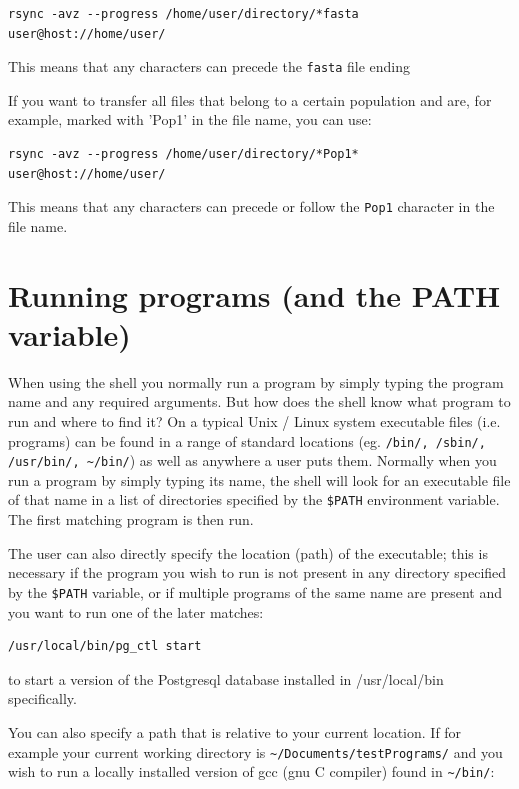 \documentclass[11pt]{article}
\begin{document}
\begin{verbatim}
rsync -avz --progress /home/user/directory/*fasta user@host://home/user/
\end{verbatim}
This means that any characters can precede the \texttt{fasta} file ending



If you want to transfer all files that belong to a certain population
and are, for example, marked with 'Pop1' in the file name, you can use:

\begin{verbatim}
rsync -avz --progress /home/user/directory/*Pop1* user@host://home/user/
\end{verbatim}
This means that any characters can precede or follow the \texttt{Pop1}
character in the file name.

\section{Running programs (and the PATH variable)}
\label{sec-3}

When using the shell you normally run a program by simply typing the
program name and any required arguments. But how does the shell know
what program to run and where to find it? On a typical Unix / Linux
system executable files (i.e. programs) can be found in a range of
standard locations (eg. \texttt{/bin/, /sbin/, /usr/bin/, \textasciitilde{}/bin/}) as well as
anywhere a user puts them. Normally when you run a program by simply
typing its name, the shell will look for an executable file of that name
in a list of directories specified by the \texttt{\$PATH} environment variable.
The first matching program is then run.

The user can also directly specify the location (path) of the
executable; this is necessary if the program you wish to run is not
present in any directory specified by the \texttt{\$PATH} variable, or if
multiple programs of the same name are present and you want to run one
of the later matches:

\begin{verbatim}
/usr/local/bin/pg_ctl start
\end{verbatim}

to start a version of the Postgresql database installed in
/usr/local/bin specifically.

You can also specify a path that is relative to your current location.
If for example your current working directory is
\texttt{\textasciitilde{}/Documents/testPrograms/} and you wish to run a locally installed
version of gcc (gnu C compiler) found in \texttt{\textasciitilde{}/bin/}:
\end{document}
